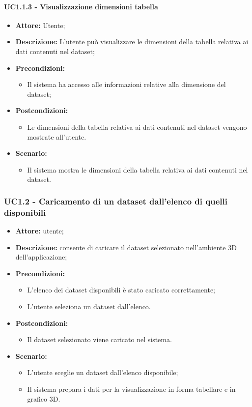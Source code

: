 \paragraph{UC1.1.3 - Visualizzazione dimensioni tabella}
\begin{itemize}
    \item \textbf{Attore:} Utente;
    \item \textbf{Descrizione:} L'utente può visualizzare le dimensioni della tabella relativa ai dati contenuti nel dataset;
    \item \textbf{Precondizioni:}
    \begin{itemize}
        \item Il sistema ha accesso alle informazioni relative alla dimensione del dataset;
    \end{itemize}
    \item \textbf{Postcondizioni:}
    \begin{itemize}
        \item Le dimensioni della tabella relativa ai dati contenuti nel dataset vengono mostrate all'utente.
    \end{itemize}
    \item \textbf{Scenario:}
    \begin{itemize}
        \item Il sistema mostra le dimensioni della tabella relativa ai dati contenuti nel dataset.
    \end{itemize}
\end{itemize}

\subsubsection{UC1.2 - Caricamento di un dataset dall'elenco di quelli disponibili}
\begin{itemize}
    \item \textbf{Attore:} utente;
    \item \textbf{Descrizione:} consente di caricare il dataset selezionato nell'ambiente 3D dell'applicazione;
    \item \textbf{Precondizioni:}
    \begin{itemize}
        \item L'elenco dei dataset disponibili è stato caricato correttamente;
        \item L'utente seleziona un dataset dall'elenco.
    \end{itemize}
    \item \textbf{Postcondizioni:}
    \begin{itemize}
        \item Il dataset selezionato viene caricato nel sistema.
    \end{itemize}
    \item \textbf{Scenario:}
    \begin{itemize}
        \item L'utente sceglie un dataset dall'elenco disponibile;
        \item Il sistema prepara i dati per la visualizzazione in forma tabellare e in grafico 3D.
    \end{itemize}
\end{itemize}
\newpage
